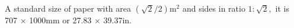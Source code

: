 A standard size of paper with area $ ( \sqrt{2} / 2 ) \mathrm{m}^2 $ and sides in ratio
$ 1 : \sqrt{2} , $ it is 707 \ensuremath{ \times } 1000mm or 27.83 \ensuremath{ \times } 39.37in.